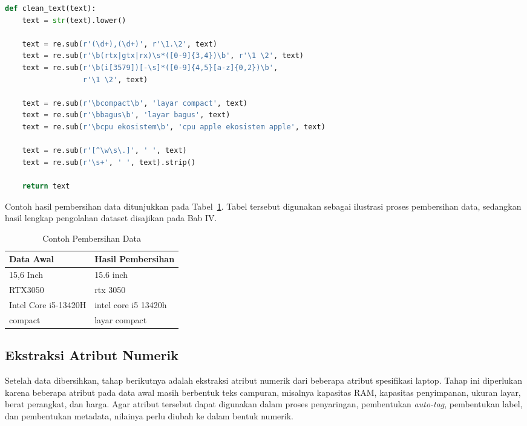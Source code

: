 \begin{lstlisting}[basicstyle=\linespread{0.8}\ttfamily\footnotesize, language=Python, breaklines=true, caption={Potongan Kode Fungsi Pembersihan Teks}, label=kode:pembersihan_teks_metadata]
def clean_text(text):
    text = str(text).lower()

    text = re.sub(r'(\d+),(\d+)', r'\1.\2', text)
    text = re.sub(r'\b(rtx|gtx|rx)\s*([0-9]{3,4})\b', r'\1 \2', text)
    text = re.sub(r'\b(i[3579])[-\s]*([0-9]{4,5}[a-z]{0,2})\b',
                  r'\1 \2', text)

    text = re.sub(r'\bcompact\b', 'layar compact', text)
    text = re.sub(r'\bbagus\b', 'layar bagus', text)
    text = re.sub(r'\bcpu ekosistem\b', 'cpu apple ekosistem apple', text)

    text = re.sub(r'[^\w\s\.]', ' ', text)
    text = re.sub(r'\s+', ' ', text).strip()

    return text
\end{lstlisting}

Contoh hasil pembersihan data ditunjukkan pada Tabel~\ref{tab:contoh_pembersihan_data_bab3}. Tabel tersebut digunakan sebagai ilustrasi proses pembersihan data, sedangkan hasil lengkap pengolahan dataset disajikan pada Bab IV.

\begin{table}[htbp]
\centering
\caption{Contoh Pembersihan Data}
\label{tab:contoh_pembersihan_data_bab3}
\begin{tabular}{|l|l|}
\hline
\textbf{Data Awal} & \textbf{Hasil Pembersihan} \\ \hline
15,6 Inch & 15.6 inch \\ \hline
RTX3050 & rtx 3050 \\ \hline
Intel Core i5-13420H & intel core i5 13420h \\ \hline
compact & layar compact \\ \hline
\end{tabular}
\end{table}

\subsection{Ekstraksi Atribut Numerik}
Setelah data dibersihkan, tahap berikutnya adalah ekstraksi atribut numerik dari beberapa atribut spesifikasi laptop. Tahap ini diperlukan karena beberapa atribut pada data awal masih berbentuk teks campuran, misalnya kapasitas RAM, kapasitas penyimpanan, ukuran layar, berat perangkat, dan harga. Agar atribut tersebut dapat digunakan dalam proses penyaringan, pembentukan \textit{auto-tag}, pembentukan label, dan pembentukan metadata, nilainya perlu diubah ke dalam bentuk numerik.

